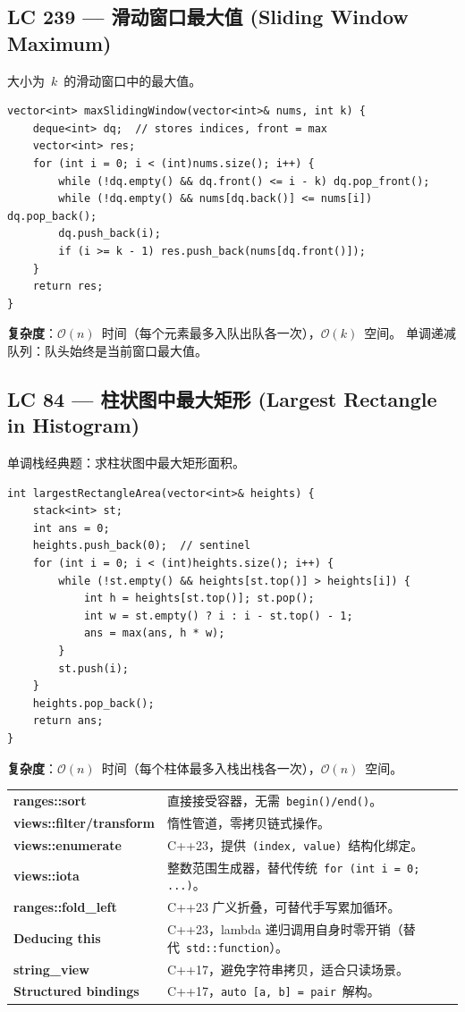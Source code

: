 \documentclass[12pt,a4paper,fontset=fandol]{ctexbook}
\newcommand{\bigO}[1]{\mathcal{O}(#1)}
\newcommand{\Tp}[1]{\texttt{#1}}
\begin{document}
\subsection*{LC 239 — 滑动窗口最大值 (Sliding Window Maximum)}

大小为~$k$~的滑动窗口中的最大值。

\begin{lstlisting}[style=cppstyle]
vector<int> maxSlidingWindow(vector<int>& nums, int k) {
    deque<int> dq;  // stores indices, front = max
    vector<int> res;
    for (int i = 0; i < (int)nums.size(); i++) {
        while (!dq.empty() && dq.front() <= i - k) dq.pop_front();
        while (!dq.empty() && nums[dq.back()] <= nums[i]) dq.pop_back();
        dq.push_back(i);
        if (i >= k - 1) res.push_back(nums[dq.front()]);
    }
    return res;
}
\end{lstlisting}
\textbf{复杂度}：$\bigO{n}$~时间（每个元素最多入队出队各一次），$\bigO{k}$~空间。
单调递减队列：队头始终是当前窗口最大值。

\subsection*{LC 84 — 柱状图中最大矩形 (Largest Rectangle in Histogram)}

单调栈经典题：求柱状图中最大矩形面积。

\begin{lstlisting}[style=cppstyle]
int largestRectangleArea(vector<int>& heights) {
    stack<int> st;
    int ans = 0;
    heights.push_back(0);  // sentinel
    for (int i = 0; i < (int)heights.size(); i++) {
        while (!st.empty() && heights[st.top()] > heights[i]) {
            int h = heights[st.top()]; st.pop();
            int w = st.empty() ? i : i - st.top() - 1;
            ans = max(ans, h * w);
        }
        st.push(i);
    }
    heights.pop_back();
    return ans;
}
\end{lstlisting}
\textbf{复杂度}：$\bigO{n}$~时间（每个柱体最多入栈出栈各一次），$\bigO{n}$~空间。

\begin{note}[title=C++20/23 现代特性速查]
\begin{tabularx}{\textwidth}{@{}l >{\raggedright\arraybackslash}X@{}}
  \textbf{ranges::sort} & 直接接受容器，无需~\texttt{begin()/end()}。\\
  \textbf{views::filter/transform} & 惰性管道，零拷贝链式操作。\\
  \textbf{views::enumerate} & C++23，提供~\texttt{(index, value)}~结构化绑定。\\
  \textbf{views::iota} & 整数范围生成器，替代传统~\texttt{for (int i = 0; ...)}。\\
  \textbf{ranges::fold\_left} & C++23 广义折叠，可替代手写累加循环。\\
  \textbf{Deducing this} & C++23，lambda 递归调用自身时零开销（替代~\Tp{std::function}）。\\
  \textbf{string\_view} & C++17，避免字符串拷贝，适合只读场景。\\
  \textbf{Structured bindings} & C++17，\texttt{auto [a, b] = pair}~解构。\\
\end{tabularx}
\end{note}

\clearpage
\backmatter
\printindex
\end{document}
